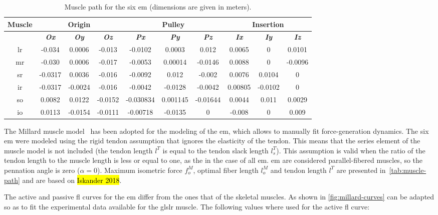\documentclass[11pt,a4paper,draft=false]{report}
\begin{document}
\begin{table}[h]
  \caption{Muscle path for the six \gls{em} (dimensions are given in
    meters).}\label{tab:muscle-path}
  \begin{tabular}{@{}cccccccccc@{}}
    \toprule
    \textbf{Muscle}
    & \multicolumn{3}{c}{\textbf{Origin}}
    & \multicolumn{3}{c}{\textbf{Pulley}}
    & \multicolumn{3}{c}{\textbf{Insertion}} \\
    \midrule
    & \textit{\textbf{Ox}} & \textit{\textbf{Oy}} & \textit{\textbf{Oz}}
    & \textit{\textbf{Px}} & \textit{\textbf{Py}} & \textit{\textbf{Pz}}
    & \textit{\textbf{Ix}} & \textit{\textbf{Iy}} & \textit{\textbf{Iz}} \\
    \midrule
    \gls{lr} & -0.034 & 0.0006 & -0.013 & -0.0102 & 0.0003 & 0.012 & 0.0065 & 0 & 0.0101 \\
    \gls{mr} & -0.030 & 0.0006 & -0.017 & -0.0053 & 0.00014 & -0.0146 & 0.0088 & 0 & -0.0096 \\
    \gls{sr} & -0.0317 & 0.0036 & -0.016 & -0.0092 & 0.012 & -0.002 & 0.0076 & 0.0104 & 0 \\
    \gls{ir} & -0.0317 & -0.0024 & -0.016 & -0.0042 & -0.0128 & -0.0042 & 0.00805 & -0.0102 & 0 \\
    \gls{so} & 0.0082 & 0.0122 & -0.0152 & -0.030834 & 0.001145 & -0.01644 & 0.0044 & 0.011 & 0.0029 \\
    \gls{io} & 0.0113 & -0.0154 & -0.0111 & -0.00718 & -0.0135 & 0 & -0.008 & 0 & 0.009 \\
    \bottomrule
  \end{tabular}
\end{table}

The Millard muscle model~\cite{Millard2013} has been adopted for the modeling of
the \gls{em}, which allows to manually fit force-generation dynamics. The six
\gls{em} were modeled using the rigid tendon assumption that ignores the
elasticity of the tendon. This means that the series element of the muscle model
is not included (the tendon length $l^T$ is equal to the tendon slack length
$l_s^T$). This assumption is valid when the ratio of the tendon length to the
muscle length is less or equal to one, as the in the case of all
\gls{em}. \gls{em} are considered parallel-fibered muscles, so the pennation
angle is zero ($\alpha = 0$). Maximum isometric force $f_o^M$, optimal fiber
length $l_o^M$ and tendon length $l^T$ are presented
in~\autoref{tab:muscle-path} and are based on \hl{Iskander 2018}.

The active and passive \gls{fl} curves for the \gls{em} differ from the ones
that of the skeletal muscles. As shown in \autoref{fig:millard-curves} can be
adapted so as to fit the experimental data available for the gls{lr} muscle. The
following values where used for the active \gls{fl} curve:
\end{document}
